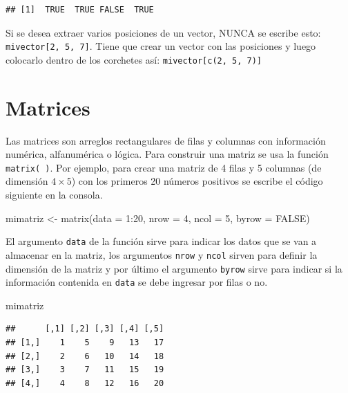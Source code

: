 \documentclass[
]{book}
\makeatletter
\newenvironment{Shaded}{\begin{snugshade}}{\end{snugshade}}
\newcommand{\AttributeTok}[1]{\textcolor[rgb]{0.77,0.63,0.00}{#1}}
\newcommand{\ConstantTok}[1]{\textcolor[rgb]{0.00,0.00,0.00}{#1}}
\newcommand{\DecValTok}[1]{\textcolor[rgb]{0.00,0.00,0.81}{#1}}
\newcommand{\FunctionTok}[1]{\textcolor[rgb]{0.00,0.00,0.00}{#1}}
\newcommand{\NormalTok}[1]{#1}
\newcommand{\OtherTok}[1]{\textcolor[rgb]{0.56,0.35,0.01}{#1}}
\newcommand{\SpecialCharTok}[1]{\textcolor[rgb]{0.00,0.00,0.00}{#1}}
\newenvironment{kframe}{%
\medskip{}
\setlength{\fboxsep}{.8em}
 \def\at@end@of@kframe{}%
 \ifinner\ifhmode%
  \def\at@end@of@kframe{\end{minipage}}%
  \begin{minipage}{\columnwidth}%
 \fi\fi%
 \def\FrameCommand##1{\hskip\@totalleftmargin \hskip-\fboxsep
 \colorbox{shadecolor}{##1}\hskip-\fboxsep
     \hskip-\linewidth \hskip-\@totalleftmargin \hskip\columnwidth}%
 \MakeFramed {\advance\hsize-\width
   \@totalleftmargin\z@ \linewidth\hsize
   \@setminipage}}%
 {\par\unskip\endMakeFramed%
 \at@end@of@kframe}
\newenvironment{rmdblock}[1]
  {
  \begin{itemize}
  \renewcommand{\labelitemi}{
    \raisebox{-.7\height}[0pt][0pt]{
      {\setkeys{Gin}{width=3em,keepaspectratio}\texttt{[image: images/\#1]}}
    }
  }
  \setlength{\fboxsep}{1em}
  \begin{kframe}
  \item
  }
  {
  \end{kframe}
  \end{itemize}
  }
\newenvironment{rmdwarning}
  {\begin{rmdblock}{warning}}
  {\end{rmdblock}}
\makeatother
\begin{document}
\begin{verbatim}
## [1]  TRUE  TRUE FALSE  TRUE
\end{verbatim}

\begin{rmdwarning}
Si se desea extraer varios posiciones de un vector, NUNCA se escribe esto: \texttt{mivector{[}2,\ 5,\ 7{]}}. Tiene que crear un vector con las posiciones y luego colocarlo dentro de los corchetes así: \texttt{mivector{[}c(2,\ 5,\ 7){]}}
\end{rmdwarning}

\hypertarget{matrices}{%
\section{Matrices}\label{matrices}}

Las matrices  son arreglos rectangulares de filas y columnas con información numérica, alfanumérica o lógica. Para construir una matriz se usa la función \texttt{matrix(\ )}. Por ejemplo, para crear una matriz de 4 filas y 5 columnas (de dimensión \(4 \times 5\)) con los primeros 20 números positivos se escribe el código siguiente en la consola.

\begin{Shaded}
\begin{Highlighting}[]
\NormalTok{mimatriz }\OtherTok{\textless{}{-}} \FunctionTok{matrix}\NormalTok{(}\AttributeTok{data =} \DecValTok{1}\SpecialCharTok{:}\DecValTok{20}\NormalTok{, }\AttributeTok{nrow =} \DecValTok{4}\NormalTok{, }\AttributeTok{ncol =} \DecValTok{5}\NormalTok{, }\AttributeTok{byrow =} \ConstantTok{FALSE}\NormalTok{)}
\end{Highlighting}
\end{Shaded}

El argumento \texttt{data} de la función sirve para indicar los datos que se van a almacenar en la matriz, los argumentos \texttt{nrow} y \texttt{ncol} sirven para definir la dimensión de la matriz y por último el argumento \texttt{byrow} sirve para indicar si la información contenida en \texttt{data} se debe ingresar por filas o no.

\begin{Shaded}
\begin{Highlighting}[]
\NormalTok{mimatriz}
\end{Highlighting}
\end{Shaded}

\begin{verbatim}
##      [,1] [,2] [,3] [,4] [,5]
## [1,]    1    5    9   13   17
## [2,]    2    6   10   14   18
## [3,]    3    7   11   15   19
## [4,]    4    8   12   16   20
\end{verbatim}
\end{document}

